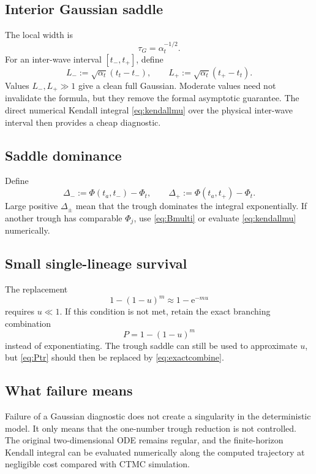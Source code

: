 \documentclass[11pt]{article}
\newcommand{\e}{\mathrm e}
\newcommand{\PhiB}{\Phi}
\begin{document}
\subsection{Interior Gaussian saddle}

The local width is
\[
\tau_G=\alpha_t^{-1/2}.
\]
For an inter-wave interval \([t_-,t_+]\), define
\begin{equation}
L_-:=\sqrt{\alpha_t}(t_t-t_-),
\qquad
L_+:=\sqrt{\alpha_t}(t_+-t_t).\label{eq:Lpm}
\end{equation}
Values \(L_-,L_+\gg1\) give a clean full Gaussian. Moderate values need not invalidate the formula, but they remove the formal asymptotic guarantee. The direct numerical Kendall integral \eqref{eq:kendallmu} over the physical inter-wave interval then provides a cheap diagnostic.

\subsection{Saddle dominance}

Define
\[
\Delta_-:=\PhiB(t_a,t_-)-\PhiB_t,
\qquad
\Delta_+:=\PhiB(t_a,t_+)-\PhiB_t.
\]
Large positive \(\Delta_\pm\) mean that the trough dominates the integral exponentially. If another trough has comparable \(\PhiB_j\), use \eqref{eq:Bmulti} or evaluate \eqref{eq:kendallmu} numerically.

\subsection{Small single-lineage survival}

The replacement
\[
1-(1-u)^m\approx1-\e^{-mu}
\]
requires \(u\ll1\). If this condition is not met, retain the exact branching combination
\begin{equation}
P=1-(1-u)^m\label{eq:exactcombine}
\end{equation}
instead of exponentiating. The trough saddle can still be used to approximate \(u\), but \eqref{eq:Ptr} should then be replaced by \eqref{eq:exactcombine}.

\subsection{What failure means}

Failure of a Gaussian diagnostic does not create a singularity in the deterministic model. It only means that the one-number trough reduction is not controlled. The original two-dimensional ODE remains regular, and the finite-horizon Kendall integral can be evaluated numerically along the computed trajectory at negligible cost compared with CTMC simulation.
\end{document}
